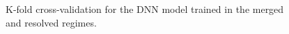 \begin{figure}[ht]
      \centering
       \caption{K-fold cross-validation for the DNN model trained in the merged and resolved regimes.}
       \label{fig:kfoldValidations}
\end{figure}


